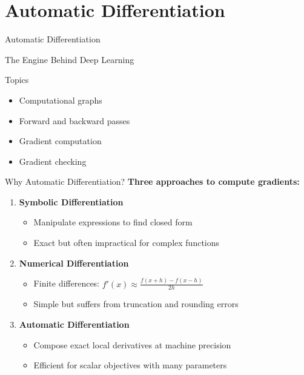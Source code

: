 \documentclass[aspectratio=169,10pt]{beamer}
\begin{document}
\section{Automatic Differentiation}

\begin{frame}{Automatic Differentiation}
\begin{center}
\Large{The Engine Behind Deep Learning}
\end{center}

\begin{block}{Topics}
\begin{itemize}
    \item Computational graphs
    \item Forward and backward passes
    \item Gradient computation
    \item Gradient checking
\end{itemize}
\end{block}
\end{frame}

\begin{frame}{Why Automatic Differentiation?}
\textbf{Three approaches to compute gradients:}

\begin{enumerate}
    \item \textbf{Symbolic Differentiation}
    \begin{itemize}
        \item Manipulate expressions to find closed form
        \item Exact but often impractical for complex functions
    \end{itemize}
    
    \item \textbf{Numerical Differentiation}
    \begin{itemize}
        \item Finite differences: $f'(x) \approx \frac{f(x+h) - f(x-h)}{2h}$
        \item Simple but suffers from truncation and rounding errors
    \end{itemize}
    
    \item \textbf{Automatic Differentiation}
    \begin{itemize}
        \item Compose exact local derivatives at machine precision
        \item Efficient for scalar objectives with many parameters
    \end{itemize}
\end{enumerate}
\end{frame}
\end{document}
